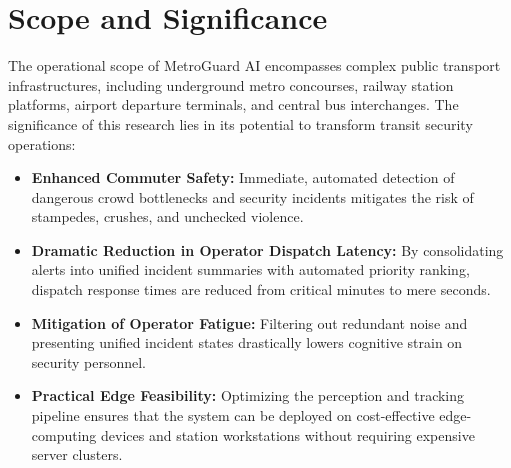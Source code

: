 \documentclass[12pt,a4paper]{report}
\begin{document}
\section{Scope and Significance}
The operational scope of MetroGuard AI encompasses complex public transport infrastructures, including underground metro concourses, railway station platforms, airport departure terminals, and central bus interchanges. The significance of this research lies in its potential to transform transit security operations:
\begin{itemize}
    \item \textbf{Enhanced Commuter Safety:} Immediate, automated detection of dangerous crowd bottlenecks and security incidents mitigates the risk of stampedes, crushes, and unchecked violence.
    \item \textbf{Dramatic Reduction in Operator Dispatch Latency:} By consolidating alerts into unified incident summaries with automated priority ranking, dispatch response times are reduced from critical minutes to mere seconds.
    \item \textbf{Mitigation of Operator Fatigue:} Filtering out redundant noise and presenting unified incident states drastically lowers cognitive strain on security personnel.
    \item \textbf{Practical Edge Feasibility:} Optimizing the perception and tracking pipeline ensures that the system can be deployed on cost-effective edge-computing devices and station workstations without requiring expensive server clusters.
\end{itemize}
\end{document}
